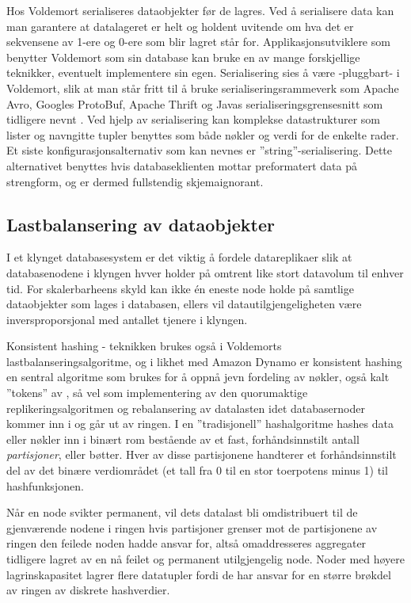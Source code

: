 Hos Voldemort serialiseres dataobjekter før de lagres. Ved å serialisere data kan man garantere at datalageret er helt og holdent uvitende om hva det er sekvensene av 1-ere og 0-ere som blir lagret står for. Applikasjonsutviklere som benytter Voldemort som sin database kan bruke en av mange forskjellige teknikker, eventuelt implementere sin egen. Serialisering sies å være -pluggbart- i Voldemort, slik at man står fritt til å bruke serialiseringsrammeverk som Apache Avro, Googles ProtoBuf, Apache Thrift og Javas serialiseringsgrensesnitt som tidligere nevnt \citep{kreps2009}. Ved hjelp av serialisering kan komplekse datastrukturer som lister og navngitte tupler benyttes som både nøkler og verdi for de enkelte rader. Et siste konfigurasjonsalternativ som kan nevnes er ''string''-serialisering. Dette alternativet benyttes hvis databaseklienten mottar preformatert data på strengform, og er dermed fullstendig skjemaignorant.

\subsection{Lastbalansering av dataobjekter}

I et klynget databasesystem er det viktig å fordele datareplikaer slik at databasenodene i klyngen hvver holder på omtrent like stort datavolum til enhver tid. For skalerbarheens skyld kan ikke én eneste node holde på samtlige dataobjekter som lages i databasen, ellers vil datautilgjengeligheten være inversproporsjonal med antallet tjenere i klyngen.

Konsistent hashing - teknikken brukes også i Voldemorts lastbalanseringsalgoritme, og i likhet med Amazon Dynamo er konsistent hashing en sentral algoritme som brukes for å oppnå jevn fordeling av nøkler, også kalt ''tokens'' av \cite{decandia2007}, så vel som implementering av den quorumaktige replikeringsalgoritmen og rebalansering av datalasten idet databasernoder kommer inn i og går ut av ringen. I en ''tradisjonell'' hashalgoritme hashes data eller nøkler inn i binært rom bestående av et fast, forhåndsinnstilt antall \emph{partisjoner}, eller bøtter. Hver av disse partisjonene handterer et forhåndsinnstilt del av det binære verdiområdet (et tall fra 0 til en stor toerpotens minus 1) til hashfunksjonen.

Når en node svikter permanent, vil dets datalast bli omdistribuert til de gjenværende nodene i ringen hvis partisjoner grenser mot de partisjonene av ringen den feilede noden hadde ansvar for, altså omaddresseres aggregater tidligere lagret av en nå feilet og permanent utilgjengelig node. Noder med høyere lagrinskapasitet lagrer flere datatupler fordi de har ansvar for en større brøkdel av ringen av diskrete hashverdier.

